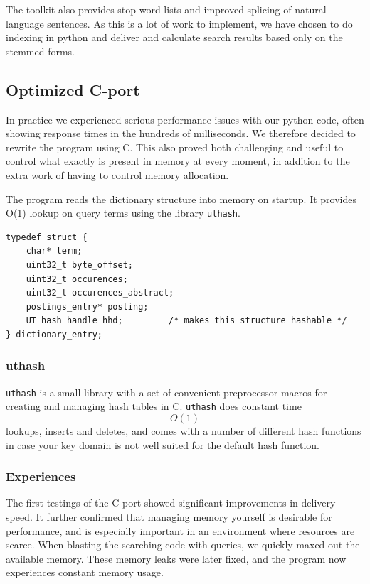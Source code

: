 The toolkit also provides stop word lists and improved splicing of natural language sentences. As this is a lot of work to implement, we have chosen to do indexing in python and deliver and calculate search results based only on the stemmed forms.

\subsection{Optimized C-port}
In practice we experienced serious performance issues with our python code, often showing response times in the hundreds of milliseconds. We therefore decided to rewrite the program using C. This also proved both challenging and useful to control what exactly is present in memory at every moment, in addition to the extra work of having to control memory allocation.

The program reads the dictionary structure into memory on startup. It provides O(1) lookup on query terms using the library {\tt uthash}\cite{uthash}.

\begin{lstlisting}[style=customc,captionpos=b,caption={Structure of a dictionary entry (term)}]
typedef struct {
    char* term;
    uint32_t byte_offset;
    uint32_t occurences;
    uint32_t occurences_abstract;
    postings_entry* posting;
    UT_hash_handle hhd;         /* makes this structure hashable */
} dictionary_entry;
\end{lstlisting}
\subsubsection{uthash}
{\tt uthash} is a small library with a set of convenient preprocessor macros for creating and managing hash tables in C. 
{\tt uthash} does constant time $$O(1)$$ lookups, inserts and deletes, and comes with a number of different hash functions in case your key domain is not well suited for the default hash function. 

\subsubsection{Experiences}
The first testings of the C-port showed significant improvements in delivery speed.
It further confirmed that managing memory yourself is desirable for performance, and is especially important in an environment where resources are scarce. 
When blasting the searching code with queries, we quickly maxed out the available memory.
These memory leaks were later fixed, and the program now experiences constant memory usage.

